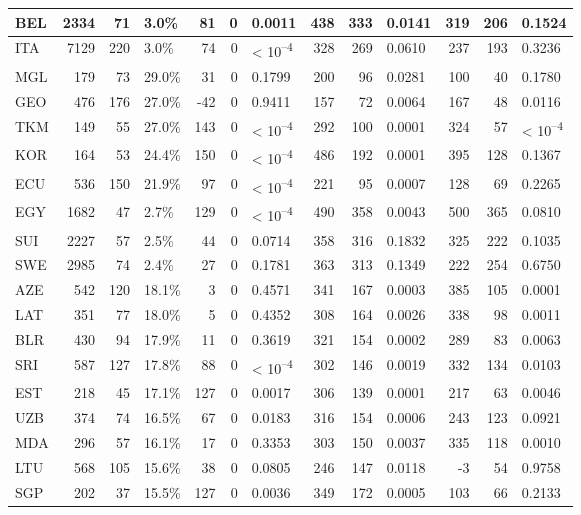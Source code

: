 \begin{tabular}{l|r|r|l|r|r|l|r|r|l|r|r|l}
BEL & 2334 & 71 & 3.0\% & 81 & 0 & 0.0011 & 438 & 333 & 0.0141 & 319 & 206 & 0.1524\\
\hline
ITA & 7129 & 220 & 3.0\% & 74 & 0 & < 10\textsuperscript{--4} & 328 & 269 & 0.0610 & 237 & 193 & 0.3236\\
\hline
MGL & 179 & 73 & 29.0\% & 31 & 0 & 0.1799 & 200 & 96 & 0.0281 & 100 & 40 & 0.1780\\
\hline
GEO & 476 & 176 & 27.0\% & -42 & 0 & 0.9411 & 157 & 72 & 0.0064 & 167 & 48 & 0.0116\\
\hline
TKM & 149 & 55 & 27.0\% & 143 & 0 & < 10\textsuperscript{--4} & 292 & 100 & 0.0001 & 324 & 57 & < 10\textsuperscript{--4}\\
\hline
KOR & 164 & 53 & 24.4\% & 150 & 0 & < 10\textsuperscript{--4} & 486 & 192 & 0.0001 & 395 & 128 & 0.1367\\
\hline
ECU & 536 & 150 & 21.9\% & 97 & 0 & < 10\textsuperscript{--4} & 221 & 95 & 0.0007 & 128 & 69 & 0.2265\\
\hline
EGY & 1682 & 47 & 2.7\% & 129 & 0 & < 10\textsuperscript{--4} & 490 & 358 & 0.0043 & 500 & 365 & 0.0810\\
\hline
SUI & 2227 & 57 & 2.5\% & 44 & 0 & 0.0714 & 358 & 316 & 0.1832 & 325 & 222 & 0.1035\\
\hline
SWE & 2985 & 74 & 2.4\% & 27 & 0 & 0.1781 & 363 & 313 & 0.1349 & 222 & 254 & 0.6750\\
\hline
AZE & 542 & 120 & 18.1\% & 3 & 0 & 0.4571 & 341 & 167 & 0.0003 & 385 & 105 & 0.0001\\
\hline
LAT & 351 & 77 & 18.0\% & 5 & 0 & 0.4352 & 308 & 164 & 0.0026 & 338 & 98 & 0.0011\\
\hline
BLR & 430 & 94 & 17.9\% & 11 & 0 & 0.3619 & 321 & 154 & 0.0002 & 289 & 83 & 0.0063\\
\hline
SRI & 587 & 127 & 17.8\% & 88 & 0 & < 10\textsuperscript{--4} & 302 & 146 & 0.0019 & 332 & 134 & 0.0103\\
\hline
EST & 218 & 45 & 17.1\% & 127 & 0 & 0.0017 & 306 & 139 & 0.0001 & 217 & 63 & 0.0046\\
\hline
UZB & 374 & 74 & 16.5\% & 67 & 0 & 0.0183 & 316 & 154 & 0.0006 & 243 & 123 & 0.0921\\
\hline
MDA & 296 & 57 & 16.1\% & 17 & 0 & 0.3353 & 303 & 150 & 0.0037 & 335 & 118 & 0.0010\\
\hline
LTU & 568 & 105 & 15.6\% & 38 & 0 & 0.0805 & 246 & 147 & 0.0118 & -3 & 54 & 0.9758\\
\hline
SGP & 202 & 37 & 15.5\% & 127 & 0 & 0.0036 & 349 & 172 & 0.0005 & 103 & 66 & 0.2133\\

\end{tabular}
